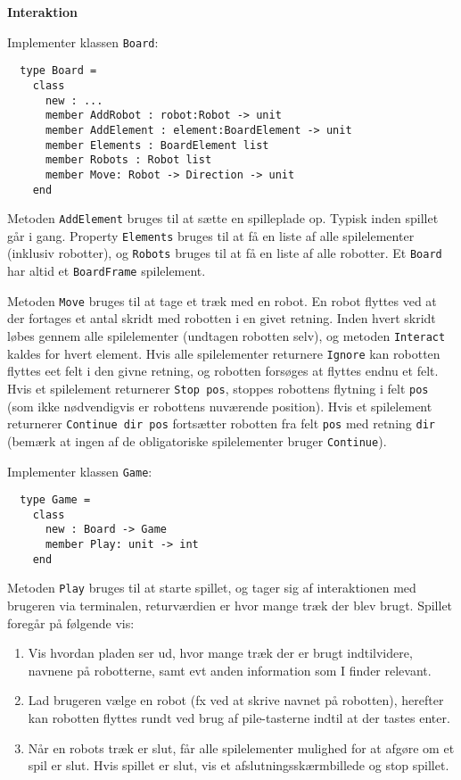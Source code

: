 \textbf{Interaktion}

Implementer klassen \lstinline{Board}:

\begin{lstlisting}
  type Board =
    class
      new : ...
      member AddRobot : robot:Robot -> unit
      member AddElement : element:BoardElement -> unit
      member Elements : BoardElement list
      member Robots : Robot list
      member Move: Robot -> Direction -> unit
    end
\end{lstlisting}

Metoden \lstinline{AddElement} bruges til at sætte en spilleplade
op. Typisk inden spillet går i gang. Property \lstinline{Elements}
bruges til at få en liste af alle spilelementer (inklusiv robotter),
og \lstinline{Robots} bruges til at få en liste af alle robotter. Et
\lstinline{Board} har altid et \lstinline{BoardFrame} spilelement.

Metoden \lstinline{Move} bruges til at tage et træk med en robot. En
robot flyttes ved at der fortages et antal skridt med robotten i en
givet retning. Inden hvert skridt løbes gennem alle spilelementer (undtagen
robotten selv), og metoden \lstinline{Interact} kaldes for hvert
element. Hvis alle spilelementer returnere \lstinline{Ignore} kan
robotten flyttes eet felt i den givne retning, og robotten forsøges at
flyttes endnu et felt. Hvis et spilelement returnerer \lstinline{Stop pos},
stoppes robottens flytning i felt \lstinline{pos} (som ikke
nødvendigvis er robottens nuværende position). Hvis et spilelement
returnerer \lstinline{Continue dir pos} fortsætter robotten fra felt
\lstinline{pos} med retning \lstinline{dir} (bemærk at ingen af de
obligatoriske spilelementer bruger \lstinline{Continue}).


Implementer klassen \lstinline{Game}:

\begin{lstlisting}
  type Game =
    class
      new : Board -> Game
      member Play: unit -> int
    end
\end{lstlisting}

Metoden \lstinline{Play} bruges til at starte spillet, og tager sig af
interaktionen med brugeren via terminalen, returværdien er hvor mange
træk der blev brugt. Spillet
foregår på følgende vis:
\begin{enumerate}
 \item Vis hvordan pladen ser ud, hvor mange træk der er brugt
  indtilvidere, navnene på robotterne, samt evt anden information som
  I finder relevant.
\item Lad brugeren vælge en robot (fx ved at skrive navnet på
  robotten), herefter kan robotten flyttes rundt ved brug af
  pile-tasterne indtil at der tastes enter.

\item Når en robots træk er slut, får alle spilelementer mulighed for at
  afgøre om et spil er slut. Hvis spillet er slut, vis et
  afslutningsskærmbillede og stop spillet.
\end{enumerate}

